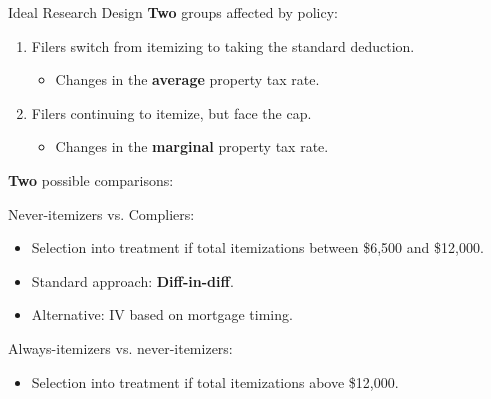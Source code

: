 \documentclass[10pt, aspectratio=169]{beamer}
\begin{document}
\begin{frame}{Ideal Research Design}
    \textbf{Two} groups affected by policy:
    \begin{enumerate}
        \item Filers switch from itemizing to taking the standard deduction.
        \begin{itemize}
            \item[$\rightarrow$] \normalsize Changes in the \alert{\textbf{average}} property tax rate.
        \end{itemize}
        \item Filers continuing to itemize, but face the cap.
        \begin{itemize}
            \item[$\rightarrow$] \normalsize Changes in the \alert{\textbf{marginal}} property tax rate.
        \end{itemize}
    \end{enumerate}

    \textbf{Two} possible comparisons:
    \begin{exampleblock}{Never-itemizers vs. Compliers:}
        \begin{itemize}
            \item Selection into treatment if total itemizations between \$6,500 and \$12,000.
            \item Standard approach: \textbf{Diff-in-diff}.
            \item Alternative: IV based on mortgage timing.
        \end{itemize}
    \end{exampleblock}
    
    \begin{exampleblock}{Always-itemizers vs. never-itemizers:}
        \begin{itemize}
            \item Selection into treatment if total itemizations  above \$12,000.
        \end{itemize}
    \end{exampleblock}
\end{frame}
\end{document}
